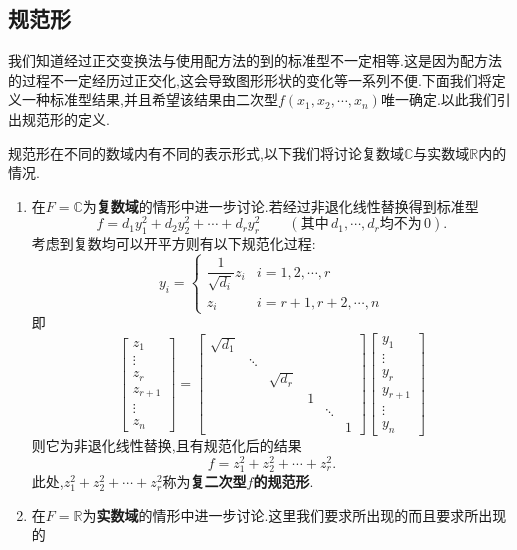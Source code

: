 \documentclass[9pt,a4paper]{book}
\begin{document}
\subsection{规范形}

我们知道经过正交变换法与使用配方法的到的标准型不一定相等.这是因为配方法的过程不一定经历过正交化,这会导致图形形状的变化等一系列不便.下面我们将定义一种标准型结果,并且希望该结果由二次型$f(x_{1},x_{2},\cdots,x_{n})$唯一确定.以此我们引出规范形的定义.
\begin{defination}[规范形的定义]

规范形在不同的数域内有不同的表示形式,以下我们将讨论复数域$ \mathbb{C} $与实数域$  \mathbb{R} $内的情况.
	\begin{enumerate}
	\item 在$ F=\mathbb{C} $为\textbf{复数域}的情形中进一步讨论.若经过非退化线性替换得到标准型
		\[ f=d_1y_1^2+d_2y_2^2+\cdots+d_ry_r^2\qquad (\mbox{其中}\,d_1,\cdots,d_r\mbox{均不为}\,0).\]考虑到复数均可以开平方则有以下规范化过程:
		\[ 	y_i=\begin{cases}
		\dfrac{1}{\sqrt{d_i}}z_i&i=1,2,\cdots,r \\
		z_i &i=r+1,r+2,\cdots,n
		\end{cases}
		 \]即\[ 
		 \begin{bmatrix}
		 z_1\\\vdots\\z_r\\z_{r+1}\\\vdots\\z_n
		 \end{bmatrix}
		 =
		 \begin{bmatrix}
		 \sqrt{d_1}&&&&&\\
		 &\ddots&&&&\\
		 &&\sqrt{d_r}&&&\\
		 &&&1&&\\
		&&&&\ddots&\\
		 &&&&&1
		 \end{bmatrix}
		 \begin{bmatrix}
		 y_1\\\vdots\\y_r\\y_{r+1}\\\vdots\\y_n
		 \end{bmatrix}
		  \]则它为非退化线性替换,且有规范化后的结果
		 \[ f=z_1^2+z_2^2+\cdots+z_r^2 .\]
		 此处,$ z_1^2+z_2^2+\cdots+z_r^2  $称为\textbf{复二次型$ f $的规范形}.
		\item 在$ F=\mathbb{R} $为\textbf{实数域}的情形中进一步讨论.这里我们要求所出现的而且要求所出现的
		

\end{enumerate}
\end{defination}
\end{document}
